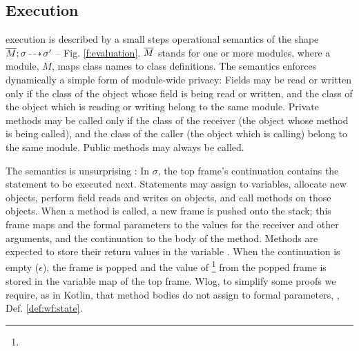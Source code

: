 {  

  
\subsection{\LangOO Execution}
\label{sect:execution}

 \LangOO execution is described by a small steps operational semantics of the shape $\overline{M};\sigma\! \dashrightarrow\! {\sigma'}$ 
 -- {\cf Fig. \ref{f:evaluation}.} 
  $\overline{M}$ stands for one or more modules, where a
  module,  $M$, maps class names to class definitions. 
{The semantics enforces dynamically a simple form of module-wide privacy: 
Fields may be read or written only if the class of the object whose field is being read or written, and the class of the object which is reading or writing belong to the same module.}
Private methods may be called only if the class of the receiver (the object whose method is being called), and the class of the caller (the object which is calling) belong to the same module.
Public methods may always be called.

The semantics is unsurprising :  
In $\sigma$, the  top frame's continuation contains the statement to be  executed next.  
 Statements may assign to variables, allocate new objects, 
perform field reads and writes on objects, and
 call methods on those objects. 
When a method is called, a new frame is pushed onto the stack; this frame  maps  and the formal parameters to  the values for the receiver and other arguments, and the continuation to the body of the method. 
{Methods are expected to store their return values in the variable .}
 When the continuation is {empty ($\epsilon$), the frame is popped and the value of 
 {}
 {\footnote {}}
 from the popped frame  is stored  in the variable map of the top frame.}
Wlog, {to simplify some proofs} we  require, as in Kotlin, that method bodies do not assign to formal parameters, , \cf Def.  \ref{def:wf:state}.  

}
